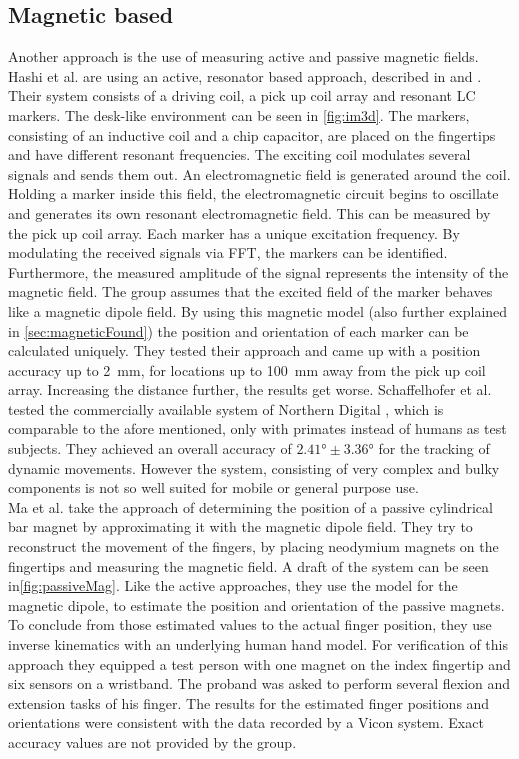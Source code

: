 \subsection{Magnetic based} \label{subsec:approaches:magnetic}
Another approach is the use of measuring active and passive magnetic fields. Hashi et al. are using an active, resonator based approach, described in \cite{hashi2006wireless} and \cite{huang2014im3d}. Their system consists of a driving coil, a pick up coil array and resonant LC markers. The desk-like environment can be seen in \ref{fig:im3d}. The markers, consisting of an inductive coil and a chip capacitor, are placed on the fingertips and have different resonant frequencies. The exciting coil modulates several signals and sends them out. An electromagnetic field is generated around the coil. Holding a marker inside this field, the electromagnetic circuit begins to oscillate and generates its own resonant electromagnetic field. This can be measured by the pick up coil array. Each marker has a unique excitation frequency. By modulating the received signals via \ac{FFT}, the markers can be identified. Furthermore, the measured amplitude of the signal represents the intensity of the magnetic field. The group assumes that the excited field of the marker behaves like a magnetic dipole field. By using this magnetic model (also further explained in \ref{sec:magneticFound}) the position and orientation of each marker can be calculated uniquely. They tested their approach and came up with a position accuracy up to \SI{2}{\mm}, for locations up to \SI{100}{mm} away from the pick up coil array. Increasing the distance further, the results get worse. Schaffelhofer et al. tested the commercially available system of Northern Digital \cite{wave}, which is comparable to the afore mentioned, only with primates instead of humans as test subjects. They achieved an overall accuracy of $ \ang{2.41} \pm \ang{3.36} $ for the tracking of dynamic movements. However the system, consisting of very complex and bulky components is not so well suited for mobile or general purpose use.\\
Ma et al. take the approach of determining the position of a passive cylindrical bar magnet by approximating it with the magnetic dipole field. They try to reconstruct the movement of the fingers, by placing neodymium magnets on the fingertips and measuring the magnetic field. A draft of the system can be seen in\ref{fig:passiveMag}. Like the active approaches, they use the model for the magnetic dipole, to estimate the position and orientation of the passive magnets. To conclude from those estimated values to the actual finger position, they use inverse kinematics with an underlying human hand model. For verification of this approach they equipped a test person with one magnet on the index fingertip and six sensors on a wristband. The proband was asked to perform several flexion and extension tasks of his finger. The results for the estimated finger positions and orientations were consistent with the data recorded by a Vicon system. Exact accuracy values are not provided by the group.
